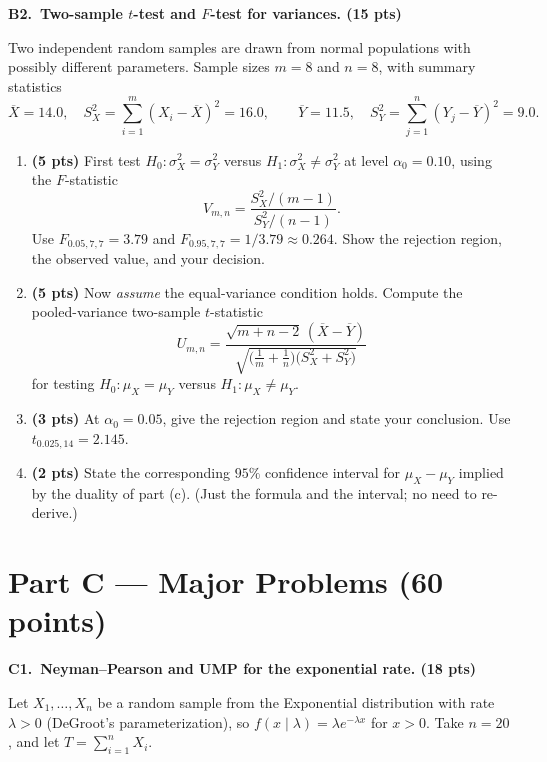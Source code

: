 \documentclass[11pt]{article}
\begin{document}
\vspace{0.6em}

\textbf{B2.\ Two-sample $t$-test and $F$-test for variances. (15 pts)}

Two independent random samples are drawn from normal populations with possibly different parameters. Sample sizes $m = 8$ and $n = 8$, with summary statistics
\[
    \overline{X} = 14.0, \quad S_X^2 = \sum_{i=1}^m (X_i - \overline{X})^2 = 16.0, \qquad
    \overline{Y} = 11.5, \quad S_Y^2 = \sum_{j=1}^n (Y_j - \overline{Y})^2 = 9.0.
\]

\begin{enumerate}[label=(\alph*), leftmargin=*]
    \item \textbf{(5 pts)} First test $H_0\!: \sigma_X^2 = \sigma_Y^2$ versus $H_1\!: \sigma_X^2 \neq \sigma_Y^2$ at level $\alpha_0 = 0.10$, using the $F$-statistic
    \[
        V_{m,n} = \frac{S_X^2/(m-1)}{S_Y^2/(n-1)}.
    \]
    Use $F_{0.05, 7, 7} = 3.79$ and $F_{0.95, 7, 7} = 1/3.79 \approx 0.264$. Show the rejection region, the observed value, and your decision.
    \item \textbf{(5 pts)} Now \emph{assume} the equal-variance condition holds. Compute the pooled-variance two-sample $t$-statistic
    \[
        U_{m,n} = \frac{\sqrt{m+n-2}\,(\overline{X} - \overline{Y})}{\sqrt{\bigl(\tfrac{1}{m}+\tfrac{1}{n}\bigr)\bigl(S_X^2 + S_Y^2\bigr)}}
    \]
    for testing $H_0\!: \mu_X = \mu_Y$ versus $H_1\!: \mu_X \neq \mu_Y$.
    \item \textbf{(3 pts)} At $\alpha_0 = 0.05$, give the rejection region and state your conclusion. Use $t_{0.025, 14} = 2.145$.
    \item \textbf{(2 pts)} State the corresponding $95\%$ confidence interval for $\mu_X - \mu_Y$ implied by the duality of part (c). (Just the formula and the interval; no need to re-derive.)
\end{enumerate}

\newpage
\section*{Part C --- Major Problems (60 points)}

\textbf{C1.\ Neyman--Pearson and UMP for the exponential rate. (18 pts)}

Let $X_1, \dots, X_n$ be a random sample from the Exponential distribution with rate $\lambda > 0$ (DeGroot's parameterization), so $f(x\mid\lambda) = \lambda e^{-\lambda x}$ for $x > 0$. Take $n = 20$, and let $T = \sum_{i=1}^n X_i$.
\end{document}
